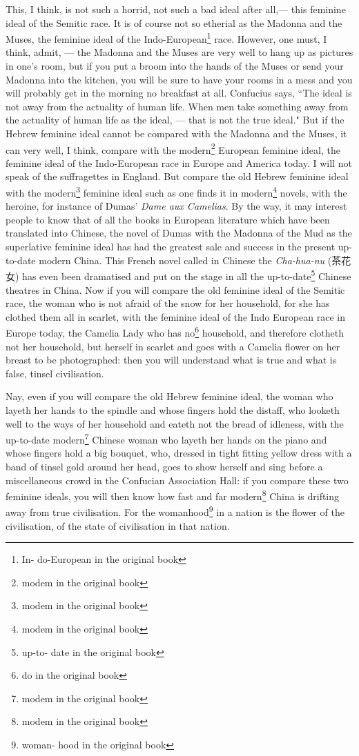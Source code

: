 This, I think, is not such a horrid, not such a bad ideal after all,--- this feminine ideal  of the Semitic race.
It is of course not so etherial as the Madonna and the Muses, the feminine ideal of the Indo-European\footnote{In- do-European in the original book} race.
However, one must, I think, admit, --- the Madonna and the Muses are very well to hang up as pictures in one's room, but if you put a broom into the hands of the Muses or send your Madonna into the kitchen, you will be sure to have your rooms in a mess and you will probably get in the morning no breakfast at all.
Confucius says, ``The ideal is not away from the actuality of human life.
When men take something away from the actuality of human life as the ideal, --- that is not the true ideal."
But if the Hebrew feminine ideal cannot be compared with the Madonna and the Muses, it can very well, I think, compare with the modern\footnote{modem in the original book} European feminine ideal, the feminine ideal of the Indo-European race in Europe and America today.
I will not speak of the suffragettes in England.
But compare the old Hebrew feminine ideal with the modern\footnote{modem in the original book} feminine ideal such as one finds it in modern\footnote{modem in the original book} novels, with the heroine, for instance of Dumas' \emph{Dame aux Camelias}. 
By the way, it may interest people to know that of all the books in European literature which have been translated into Chinese, the novel of Dumas with the Madonna of the Mud as the superlative feminine ideal has had the greatest sale and success in the present up-to-date modern China.
This French novel called in Chinese the \emph{Cha-hua-nu} (茶花女) has even been dramatised and put on the stage in all the up-to-date\footnote{up-to- date in the original book} Chinese theatres in China.
Now if you will compare the old feminine ideal of the Semitic race, the woman who is not afraid of the snow for her household, for she has clothed them all in scarlet, with the feminine ideal of the Indo European race in Europe today, the Camelia Lady who has no\footnote{do in the original book} household, and therefore clotheth not her household, but herself in scarlet and goes with a Camelia flower on her breast to be photographed: then you will understand what is true and what is false, tinsel civilisation.

Nay, even if you will compare the old Hebrew feminine ideal, the woman who layeth her hands to the spindle and whose fingers hold the distaff, who looketh well to the ways of her household and eateth not the bread of idleness, with the up-to-date modern\footnote{modem in the original book} Chinese woman who layeth her hands on the piano and whose fingers hold a big bouquet, who, dressed in tight fitting yellow dress with a band of tinsel gold around her head, goes to show herself and sing before a miscellaneous crowd in the Confucian Association Hall: if you compare these two feminine ideals, you will then know how fast and far modern\footnote{modem in the original book} China is drifting away from true civilisation.
For the womanhood\footnote{woman- hood in the original book} in a nation is the flower of the civilisation, of the state of civilisation in that nation.

